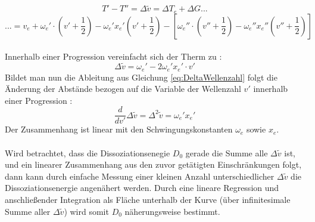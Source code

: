 \begin{equation}
T'-T''=\Delta \tilde{v} = \Delta T_e + \Delta G ...
\end{equation}
\begin{equation*}
... = v_e + \omega_e'\cdot \left(v' + \frac{1}{2}\right) - \omega_e'x_e'\left( v'+\frac{1}{2}\right)-\left[\omega_e''\cdot \left(v'' + \frac{1}{2}\right) - \omega_e''x_e''\left(v''+\frac{1}{2}\right)\right]
\end{equation*}
\\
Innerhalb einer Progression vereinfacht sich der Therm zu :
\begin{equation}
\Delta \tilde v = \omega_e' - 2\omega_e'x_e'\cdot v'
\label{eq:DeltaWellenzahl}
\end{equation}
Bildet man nun die Ableitung aus Gleichung \ref{eq:DeltaWellenzahl} folgt die Änderung der Abstände bezogen auf die Variable der Wellenzahl $v'$ innerhalb einer Progression :
\begin{equation}
\frac{d}{dv'} \Delta \tilde{v} = \Delta^2 \tilde{v} = \omega_e'x_e'
\label{eq:AbleitungDeltaWellenzahl}
\end{equation} 
Der Zusammenhang ist linear mit den Schwingungskonstanten $\omega_e$ sowie $x_e$. 
\\
\\
Wird betrachtet, dass die Dissoziationsenegie $D_0$ gerade die Summe alle $\Delta \tilde{v}$ ist, und ein linearer Zusammenhang aus den zuvor getätigten Einschränkungen folgt, dann kann durch einfache Messung einer kleinen Anzahl unterschiedlicher $\Delta \tilde{v}$ die Dissoziationsenergie angenähert werden. Durch eine lineare Regression und anschließender Integration als Fläche unterhalb der Kurve (über infinitesimale Summe aller $\Delta \tilde{v}$) wird somit $D_0$ näherungsweise bestimmt.
